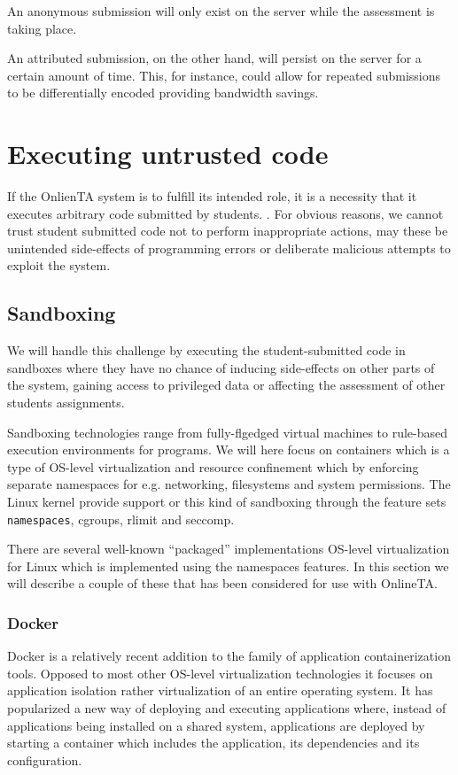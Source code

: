 An anonymous submission will only exist on the server while the
assessment is taking place.

An attributed submission, on the other hand, will persist on the
server for a certain amount of time. This, for instance, could allow
for repeated submissions to be differentially encoded providing
bandwidth savings.




\section{Executing untrusted code}
If the OnlienTA system is to fulfill its intended role, it is a
necessity that it executes arbitrary code submitted by
students. . For obvious reasons, we cannot trust
student submitted code not to perform inappropriate actions, may these
be unintended side-effects of programming errors or deliberate
malicious attempts to exploit the system.


\subsection{Sandboxing}
We will handle this challenge by executing the student-submitted code
in sandboxes where they have no chance of inducing side-effects on
other parts of the system, gaining access to privileged data or
affecting the assessment of other students assignments.


Sandboxing technologies range from fully-flgedged virtual machines to
rule-based execution environments for programs. We will here focus on
containers which is a type of OS-level virtualization and resource
confinement which  by enforcing separate
namespaces for e.g. networking, filesystems and system
permissions. The Linux kernel provide support or this kind of
sandboxing through the feature sets
\texttt{namespaces}\cite{namespaces}, cgroups, rlimit and seccomp.

There are several well-known "`packaged"' implementations OS-level
virtualization for Linux which is implemented using the namespaces
features. In this section we will describe a couple of these that has
been considered for use with OnlineTA.

\subsubsection{Docker}
Docker is a relatively recent addition to the family of application
containerization tools. Opposed to most other OS-level virtualization
technologies it focuses on application isolation rather
virtualization of an entire operating system. It has popularized a new
way of deploying and executing applications where, instead of
applications being installed on a shared system, applications are
deployed by starting a container which includes the application, its
dependencies and its configuration. \cite{whatisdocker}

